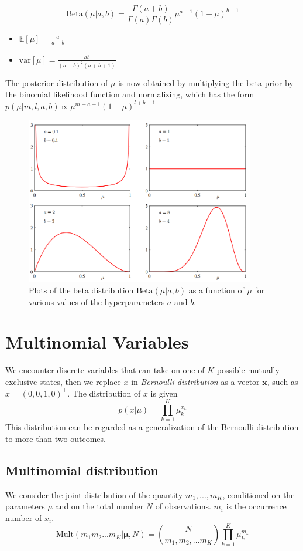 \documentclass[a3paper, 12pt]{book} %
\begin{document}
\begin{equation}
\mathrm{Beta}(\mu|a,b)=\frac{\Gamma{(a+b)}}{\Gamma{(a)}\Gamma{(b)}}\mu^{a-1}(1-\mu)^{b-1}
\end{equation}
\begin{itemize}
	\item $\mathbb{E}[\mu]=\frac{a}{a+b}$
\item $\mathrm{var}[\mu]=\frac{ab}{(a+b)^2(a+b+1)}$
\end{itemize}
The posterior distribution of $\mu$ is now obtained by multiplying the beta prior by the binomial likelihood function and normalizing, which has the form $p(\mu|m,l,a,b) \propto \mu^{m+a-1}(1-\mu)^{l+b-1}$
\begin{figure}[htpb]
	\centering
	\includegraphics[width=10cm]{figures/beta_distribution.png}
	\caption{Plots of the beta distribution $\mathrm{Beta}{(\mu|a, b)}$ as a function of $\mu$ for various values of the
hyperparameters $a$ and $b$.}
	\label{fig:boat1}
\end{figure}


\section{Multinomial Variables}
We encounter discrete variables that can take on one of $K$
possible mutually exclusive states, then we replace $x$ in \emph{Bernoulli distribution} as a vector $\boldsymbol{x}$, such as $x=(0,0,1,0)^\top$. The distribution of $x$ is given 
\begin{equation}
p(x|\mu)=\prod_{k=1}^{K}\mu_k^{x_k}
\end{equation} 
This distribution can be regarded as a generalization of the Bernoulli distribution to more than two outcomes.

\subsection{Multinomial distribution}
We consider the joint distribution of the quantity $m_1,...,m_K$, conditioned on the parameters $\mu$ and on the total number $N$ of observations. $m_i$ is the occurrence number of $x_i$.
\begin{equation}
\mathrm{Mult}{(m_1m_2...m_K|\boldsymbol{\mu},N)}=\binom{N}{m_1,m_2,...m_K}\prod_{k=1}^K{\mu_{k}^{m_k}}
\end{equation}
\end{document}
